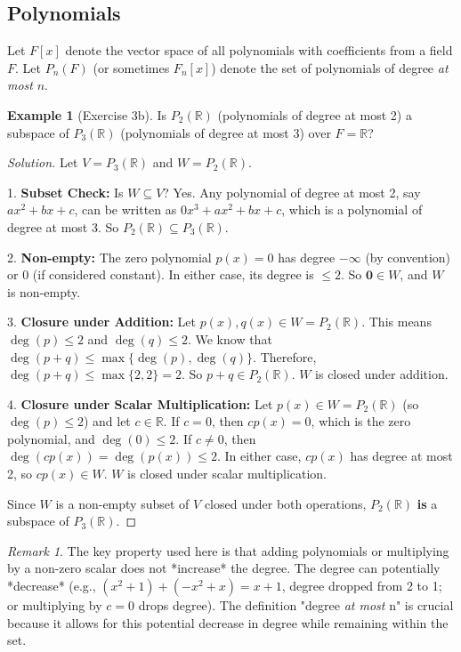 \documentclass[11pt]{article}
\theoremstyle{definition}
\newtheorem{example}[theorem]{Example}
\theoremstyle{remark}
\newtheorem{remark}[theorem]{Remark}
\newcommand{\zerovec}{\mathbf{0}}
\begin{document}
\subsection{Polynomials}

Let $F[x]$ denote the vector space of all polynomials with coefficients from a field $F$. Let $P_n(F)$ (or sometimes $F_n[x]$) denote the set of polynomials of degree \emph{at most} $n$.

\begin{example}[Exercise 3b]
Is $P_2(\mathbb{R})$ (polynomials of degree at most 2) a subspace of $P_3(\mathbb{R})$ (polynomials of degree at most 3) over $F=\mathbb{R}$?

\begin{proof}[Solution]
Let $V = P_3(\mathbb{R})$ and $W = P_2(\mathbb{R})$.

1.  \textbf{Subset Check:} Is $W \subseteq V$? Yes. Any polynomial of degree at most 2, say $ax^2+bx+c$, can be written as $0x^3 + ax^2+bx+c$, which is a polynomial of degree at most 3. So $P_2(\mathbb{R}) \subseteq P_3(\mathbb{R})$.

2.  \textbf{Non-empty:} The zero polynomial $p(x)=0$ has degree $-\infty$ (by convention) or 0 (if considered constant). In either case, its degree is $\le 2$. So $\zerovec \in W$, and $W$ is non-empty.

3.  \textbf{Closure under Addition:} Let $p(x), q(x) \in W = P_2(\mathbb{R})$. This means $\deg(p) \le 2$ and $\deg(q) \le 2$. We know that $\deg(p+q) \le \max\{\deg(p), \deg(q)\}$. Therefore, $\deg(p+q) \le \max\{2, 2\} = 2$. So $p+q \in P_2(\mathbb{R})$. $W$ is closed under addition.

4.  \textbf{Closure under Scalar Multiplication:} Let $p(x) \in W = P_2(\mathbb{R})$ (so $\deg(p) \le 2$) and let $c \in \mathbb{R}$.
    If $c=0$, then $c p(x) = 0$, which is the zero polynomial, and $\deg(0) \le 2$.
    If $c \neq 0$, then $\deg(c p(x)) = \deg(p(x)) \le 2$.
    In either case, $c p(x)$ has degree at most 2, so $c p(x) \in W$. $W$ is closed under scalar multiplication.

Since $W$ is a non-empty subset of $V$ closed under both operations, $P_2(\mathbb{R})$ \textbf{is} a subspace of $P_3(\mathbb{R})$.
\end{proof}
\end{example}

\begin{remark}
The key property used here is that adding polynomials or multiplying by a non-zero scalar does not *increase* the degree. The degree can potentially *decrease* (e.g., $(x^2+1) + (-x^2+x) = x+1$, degree dropped from 2 to 1; or multiplying by $c=0$ drops degree). The definition "degree \emph{at most} n" is crucial because it allows for this potential decrease in degree while remaining within the set.
\end{remark}
\end{document}
